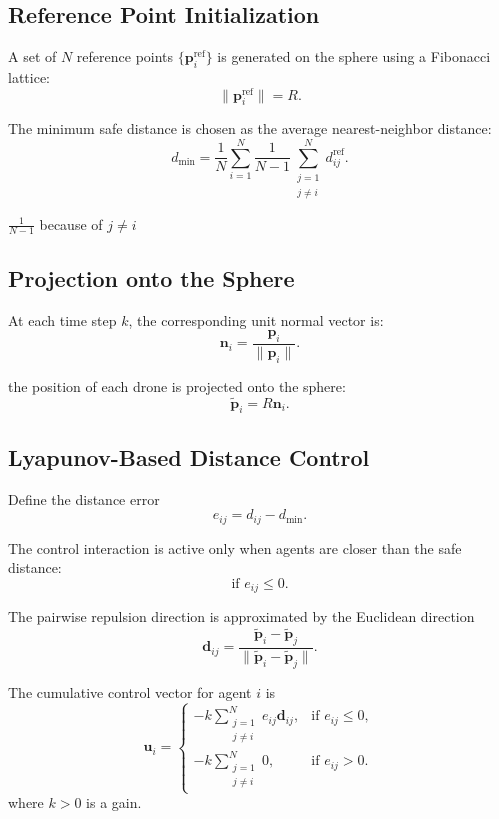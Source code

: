\documentclass{article}
\begin{document}
\subsection*{Reference Point Initialization}

A set of $N$ reference points $\{\bm{p}_i^{\mathrm{ref}}\}$ is generated on the sphere using a Fibonacci lattice:
\[
\|\bm{p}_i^{\mathrm{ref}}\| = R.
\]

The minimum safe distance is chosen as the average nearest-neighbor distance:
\begin{equation}
    d_{\min} = \frac{1}{N} \sum_{i=1}^N
    \frac{1}{N-1} \sum_{\substack{j=1 \\ j \neq i}}^N d_{ij}^{\mathrm{ref}}.
\end{equation}

$\frac{1}{N-1}$ because of $j \neq i$


\subsection*{Projection onto the Sphere}

At each time step $k$, the corresponding unit normal vector is: 
\[
\bm{n}_i = \frac{\bm{p}_i}{\|\bm{p}_i\|}.
\]


the position of each drone is projected onto the sphere:
\[
\tilde{\bm{p}}_i = R \bm{n}_i.
\]

\subsection*{Lyapunov-Based Distance Control}

Define the distance error
\[
e_{ij} = d_{ij} - d_{\min}.
\]

The control interaction is active only when agents are closer than the safe distance:
\[
\text{if } e_{ij} \le 0.
\]

The pairwise repulsion direction is approximated by the Euclidean direction
\[
\bm{d}_{ij} = \frac{\tilde{\bm{p}}_i - \tilde{\bm{p}}_j}
{\|\tilde{\bm{p}}_i - \tilde{\bm{p}}_j\|}.
\]

The cumulative control vector for agent $i$ is
\begin{equation}
    \bm{u}_i =
    \begin{cases}
    - k \displaystyle\sum_{\substack{j=1 \\ j \neq i}}^N e_{ij} \bm{d}_{ij}, & \text{if } e_{ij} \le 0, \\[6pt]
    - k \displaystyle\sum_{\substack{j=1 \\ j \neq i}}^N 0, & \text{if } e_{ij} > 0.
    \end{cases}
\end{equation}
where $k > 0$ is a gain.
\end{document}
